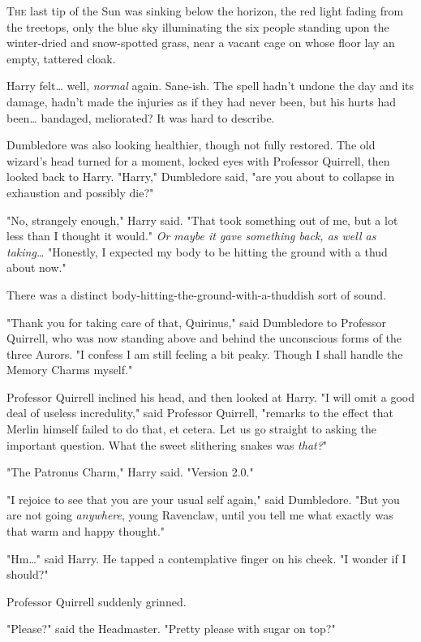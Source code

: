 
\lettrine{T}{he} last tip of 
the Sun was sinking below the horizon, the red light fading from the treetops, 
only the blue sky illuminating the six people standing upon the winter-dried 
and snow-spotted grass, near a vacant cage on whose floor lay an empty, 
tattered cloak.

Harry felt{\ldots} well, \emph{normal} again. Sane-ish. The spell hadn't undone 
the day and its damage, hadn't made the injuries as if they had never been, but 
his hurts had been{\ldots} bandaged, meliorated? It was hard to describe.

Dumbledore was also looking healthier, though not fully restored. The old 
wizard's head turned for a moment, locked eyes with Professor Quirrell, then 
looked back to Harry. "Harry," Dumbledore said, "are you about to collapse in 
exhaustion and possibly die?"

"No, strangely enough," Harry said. "That took something out of me, but a lot 
less than I thought it would." \emph{Or maybe it gave something back, as well 
as taking{\ldots}} "Honestly, I expected my body to be hitting the ground with 
a thud about now."

There was a distinct body-hitting-the-ground-with-a-thuddish sort of sound.

"Thank you for taking care of that, Quirinus," said Dumbledore to Professor 
Quirrell, who was now standing above and behind the unconscious forms of the 
three Aurors. "I confess I am still feeling a bit peaky. Though I shall handle 
the Memory Charms myself."

Professor Quirrell inclined his head, and then looked at Harry. "I will omit a 
good deal of useless incredulity," said Professor Quirrell, "remarks to the 
effect that Merlin himself failed to do that, et cetera. Let us go straight to 
asking the important question. What the sweet slithering snakes was 
\emph{that?}"

"The Patronus Charm," Harry said. "Version 2.0."

"I rejoice to see that you are your usual self again," said Dumbledore. "But 
you are not going \emph{anywhere}, young Ravenclaw, until you tell me what 
exactly was that warm and happy thought."

"Hm{\ldots}" said Harry. He tapped a contemplative finger on his cheek. "I 
wonder if I should?"

Professor Quirrell suddenly grinned.

"Please?" said the Headmaster. "Pretty please with sugar on top?"

